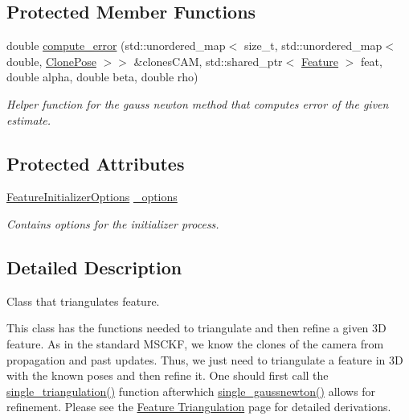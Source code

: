 \subsection*{Protected Member Functions}
\begin{DoxyCompactItemize}
\item 
double \hyperlink{classov__core_1_1FeatureInitializer_a2b851be642683766f649a751452407bf}{compute\+\_\+error} (std\+::unordered\+\_\+map$<$ size\+\_\+t, std\+::unordered\+\_\+map$<$ double, \hyperlink{structov__core_1_1FeatureInitializer_1_1ClonePose}{Clone\+Pose} $>$$>$ \&clones\+C\+AM, std\+::shared\+\_\+ptr$<$ \hyperlink{classov__core_1_1Feature}{Feature} $>$ feat, double alpha, double beta, double rho)
\begin{DoxyCompactList}\small\item\em Helper function for the gauss newton method that computes error of the given estimate. \end{DoxyCompactList}\end{DoxyCompactItemize}
\subsection*{Protected Attributes}
\begin{DoxyCompactItemize}
\item 
\mbox{\label{classov__core_1_1FeatureInitializer_a1e9a923db5dc5ced439d0516ff884964}} 
\hyperlink{structov__core_1_1FeatureInitializerOptions}{Feature\+Initializer\+Options} \hyperlink{classov__core_1_1FeatureInitializer_a1e9a923db5dc5ced439d0516ff884964}{\+\_\+options}
\begin{DoxyCompactList}\small\item\em Contains options for the initializer process. \end{DoxyCompactList}\end{DoxyCompactItemize}


\subsection{Detailed Description}
Class that triangulates feature. 

This class has the functions needed to triangulate and then refine a given 3D feature. As in the standard M\+S\+C\+KF, we know the clones of the camera from propagation and past updates. Thus, we just need to triangulate a feature in 3D with the known poses and then refine it. One should first call the \hyperlink{classov__core_1_1FeatureInitializer_a86e8f87f677689e6588516f8d08086d7}{single\+\_\+triangulation()} function afterwhich \hyperlink{classov__core_1_1FeatureInitializer_a27eb3af3c4e22473e795966eff800599}{single\+\_\+gaussnewton()} allows for refinement. Please see the \hyperlink{update-featinit}{Feature Triangulation} page for detailed derivations. 

